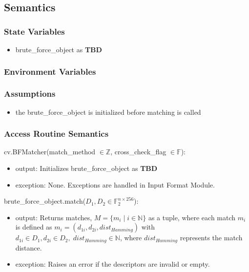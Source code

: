 \documentclass[12pt, titlepage]{article}
\begin{document}
\subsection{Semantics}

\subsubsection{State Variables}
\begin{itemize} 
  \item brute\_force\_object as \textbf{TBD}
\end{itemize}

\subsubsection{Environment Variables}

\subsubsection{Assumptions}
\begin{itemize}
  \item the brute\_force\_object is initialized before matching is called 
\end{itemize}

\subsubsection{Access Routine Semantics}

\noindent cv.BFMatcher(match\_method $\in \mathbb{Z}$, cross\_check\_flag $\in \mathbb{F}$):
\begin{itemize}
\item output: Initializes brute\_force\_object  as \textbf{TBD}
\item exception: None. Exceptions are handled in Input Format Module.
\end{itemize}

\noindent brute\_force\_object.match($D_1, D_2 \in \mathbb{F}_{2}^{n \times 256}$):
\begin{itemize}
\item output: Returns matches, $ M = \{ m_i \mid i \in \mathbb{N} \} $ as a tuple, 
where each match \( m_i \) is defined as 
$m_i = (d_{1i}, d_{2i}, dist_{Hamming})$
with $d_{1i} \in D_1, d_{2i} \in D_2, \; dist_{Hamming} \in \mathbb{N}$, 
where $dist_{Hamming}$ represents the match distance.

\item exception: Raises an error if the descriptors are invalid or empty.
\end{itemize}
\end{document}
